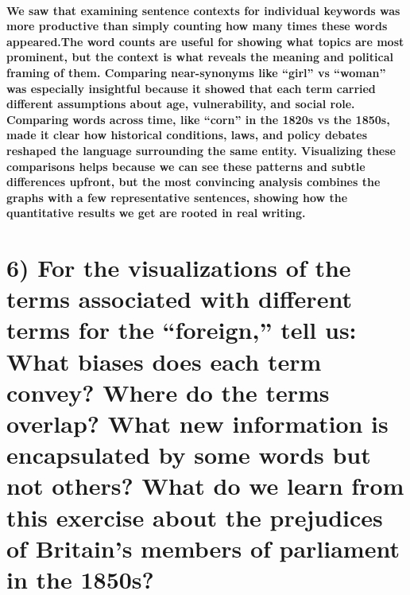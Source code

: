 \documentclass[
]{article}
\begin{document}
\paragraph{We saw that examining sentence contexts for individual
keywords was more productive than simply counting how many times these
words appeared.The word counts are useful for showing what topics are
most prominent, but the context is what reveals the meaning and
political framing of them. Comparing near-synonyms like ``girl'' vs
``woman'' was especially insightful because it showed that each term
carried different assumptions about age, vulnerability, and social role.
Comparing words across time, like ``corn'' in the 1820s vs the 1850s,
made it clear how historical conditions, laws, and policy debates
reshaped the language surrounding the same entity. Visualizing these
comparisons helps because we can see these patterns and subtle
differences upfront, but the most convincing analysis combines the
graphs with a few representative sentences, showing how the quantitative
results we get are rooted in real
writing.}\label{we-saw-that-examining-sentence-contexts-for-individual-keywords-was-more-productive-than-simply-counting-how-many-times-these-words-appeared.the-word-counts-are-useful-for-showing-what-topics-are-most-prominent-but-the-context-is-what-reveals-the-meaning-and-political-framing-of-them.-comparing-near-synonyms-like-girl-vs-woman-was-especially-insightful-because-it-showed-that-each-term-carried-different-assumptions-about-age-vulnerability-and-social-role.-comparing-words-across-time-like-corn-in-the-1820s-vs-the-1850s-made-it-clear-how-historical-conditions-laws-and-policy-debates-reshaped-the-language-surrounding-the-same-entity.-visualizing-these-comparisons-helps-because-we-can-see-these-patterns-and-subtle-differences-upfront-but-the-most-convincing-analysis-combines-the-graphs-with-a-few-representative-sentences-showing-how-the-quantitative-results-we-get-are-rooted-in-real-writing.}

\section{6) For the visualizations of the terms associated with
different terms for the ``foreign,'' tell us: What biases does each term
convey? Where do the terms overlap? What new information is encapsulated
by some words but not others? What do we learn from this exercise about
the prejudices of Britain's members of parliament in the
1850s?}\label{for-the-visualizations-of-the-terms-associated-with-different-terms-for-the-foreign-tell-us-what-biases-does-each-term-convey-where-do-the-terms-overlap-what-new-information-is-encapsulated-by-some-words-but-not-others-what-do-we-learn-from-this-exercise-about-the-prejudices-of-britains-members-of-parliament-in-the-1850s}
\end{document}
